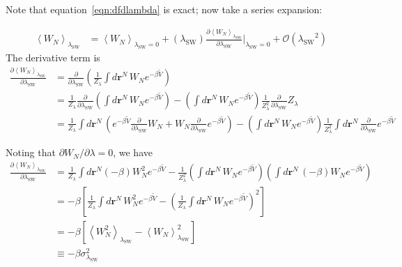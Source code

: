 \documentclass[letterpaper,twocolumn,amsmath,amssymb,prb]{revtex4-1}
\newcommand{\rr}{\ensuremath{\mathbf{r}}}
\newcommand{\lambdaSW}{\ensuremath{\lambda_\text{SW}}}
\newcommand{\1}{\ensuremath{\textbf{r}_1}}
\newcommand{\2}{\ensuremath{\textbf{r}_2}}
\newcommand{\3}{\ensuremath{\textbf{r}_3}}
\newcommand{\4}{\ensuremath{\textbf{r}_4}}
\begin{document}
Note that equation~\ref{eqn:dfdlambda} is exact; now take a series expansion:
\begin{widetext}
\begin{align}
  \left\langle W_N \right\rangle_{\lambdaSW} &= \left\langle W_N\right\rangle_{\lambdaSW = 0} + (\lambdaSW)\frac{\partial\left\langle W_N \right\rangle_{\lambdaSW}}{\partial\lambdaSW}\bigg|_{\lambdaSW = 0} + \mathcal{O}(\lambdaSW^2) \label{eqn:Wn-expansion}
\end{align}
The derivative term is
  \begin{align}
    \frac{\partial\left\langle W_N \right\rangle_{\lambdaSW}}{\partial\lambdaSW} &= \frac{\partial}{\partial\lambdaSW}\left( \frac{1}{Z_\lambda}\int d\rr^N\, W_N e^{-\beta \widetilde{V}}\right) \nonumber \\
    &= \frac{1}{Z_\lambda}\frac{\partial}{\partial\lambdaSW}\left( \int d\rr^N\, W_N e^{-\beta \widetilde{V}} \right) - \left( \int d\rr^N\, W_N e^{-\beta \widetilde{V}} \right)\frac{1}{Z_\lambda^2}\frac{\partial}{\partial\lambdaSW}Z_\lambda \nonumber \\
    &= \frac{1}{Z_\lambda}\int d\rr^N\, \left( e^{-\beta \widetilde{V}}\frac{\partial}{\partial\lambdaSW}W_N + W_N\frac{\partial}{\partial\lambdaSW}e^{-\beta \widetilde{V}} \right) - \left( \int d\rr^N\, W_N e^{-\beta \widetilde{V}} \right)\frac{1}{Z_\lambda^2}\int d\rr^N\, \frac{\partial}{\partial\lambdaSW}e^{-\beta \widetilde{V}}
  \end{align}

Noting that $\partial W_N/\partial\lambda = 0$, we have
  \begin{align}
    \frac{\partial\left\langle W_N \right\rangle_{\lambdaSW}}{\partial\lambdaSW} &= \frac{1}{Z_\lambda}\int d\rr^N (-\beta) W_N^2 e^{-\beta \widetilde{V}} - \frac{1}{Z_\lambda^2}\left(\int d\rr^N\, W_N e^{-\beta \widetilde{V}} \right)\left( \int d\rr^N\, (-\beta)W_Ne^{-\beta \widetilde{V}} \right) \nonumber \\
    &= -\beta\left[ \frac{1}{Z_\lambda}\int d\rr^N\, W_N^2e^{-\beta \widetilde{V}} - \left( \frac{1}{Z_\lambda}\int d\rr^N\, W_N e^{-\beta \widetilde{V}} \right)^2 \right] \nonumber \\
    &= -\beta\left[ \left\langle W_N^2 \right\rangle_{\lambdaSW} - \left\langle W_N \right\rangle_{\lambdaSW}^2 \right] \nonumber \\
    &\equiv -\beta\sigma_{\lambdaSW}^2
  \end{align}
\end{widetext}
\end{document}
